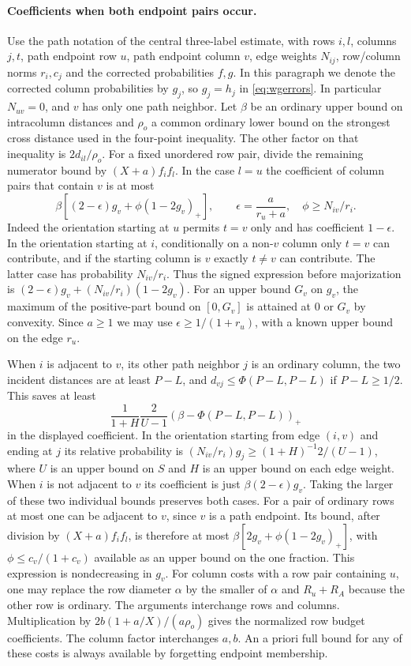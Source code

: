 \documentclass[11pt,a4paper]{article}
\theoremstyle{definition}
\begin{document}
\paragraph{Coefficients when both endpoint pairs occur.}
Use the path notation of the central three-label estimate, with rows $i,l$,
columns $j,t$, path endpoint row $u$, path endpoint column $v$, edge
weights $N_{ij}$, row/column norms $r_i,c_j$ and the corrected
probabilities $f,g$.  In this paragraph we denote the corrected column probabilities by $g_j$,
so $g_j=h_j$ in \eqref{eq:wgerrors}. In particular $N_{uv}=0$, and $v$
has only one path neighbor.  Let $\beta$ be an ordinary upper bound on
intracolumn distances and $\rho_o$ a common ordinary lower bound on the
strongest cross distance used in the four-point inequality.  The other
factor on that inequality is $2d_{il}/\rho_o$.  For a fixed unordered
row pair, divide the remaining numerator bound by $(X+a)f_i f_l$.
In the case $l=u$ the coefficient of column pairs that contain $v$ is at
most
\[
 \beta\left[(2-\epsilon)g_v+
             \phi(1-2g_v)_+\right],
 \qquad
 \epsilon=\frac{a}{r_u+a},\quad \phi\ge N_{iv}/r_i.
\]
Indeed the orientation starting at $u$ permits $t=v$ only and has
coefficient $1-\epsilon$.  In the orientation starting at $i$,
conditionally on a non-$v$ column only $t=v$ can contribute, and if the
starting column is $v$ exactly $t\ne v$ can contribute.  The latter
case has probability $N_{iv}/r_i$.  Thus the signed expression before
majorization is $(2-\epsilon)g_v+(N_{iv}/r_i)(1-2g_v)$.
For an upper bound $G_v$ on $g_v$, the maximum of the positive-part
bound on $[0,G_v]$ is attained at $0$ or $G_v$ by convexity.  Since
$a\ge1$ we may use $\epsilon\ge1/(1+r_u)$, with a known upper bound
on the edge $r_u$.

When $i$ is adjacent to $v$, its other path neighbor $j$ is an
ordinary column, the two incident distances are at least $P-L$, and
$d_{vj}\le\Phi(P-L,P-L)$ if $P-L\ge1/2$.  This saves at least
\[
 \frac{1}{1+H}\frac{2}{U-1}
       (\beta-\Phi(P-L,P-L))_+
\]
in the displayed coefficient. In the orientation starting from edge
$(i,v)$ and ending at $j$ its relative probability is
$(N_{iv}/r_i)g_j\ge(1+H)^{-1}2/(U-1)$, where $U$ is an upper bound
on $S$ and $H$ is an upper bound on each edge weight.  When $i$ is not
adjacent to $v$ its coefficient is just $\beta(2-\epsilon)g_v$.
Taking the larger of these two individual bounds preserves both cases.
For a pair of ordinary rows at most one can be adjacent to $v$,
since $v$ is a path endpoint.  Its bound, after division by
$(X+a)f_i f_l$, is therefore at most
$\beta[2g_v+\phi(1-2g_v)_+]$, with $\phi\le c_v/(1+c_v)$ available
as an upper bound on the one fraction.  This expression is nondecreasing
in $g_v$.  For column costs with a row pair containing $u$, one may
replace the row diameter $\alpha$ by the smaller of $\alpha$ and
$R_u+R_A$ because the other row is ordinary.  The arguments interchange
rows and columns.  Multiplication by $2b(1+a/X)/(a\rho_o)$ gives the
normalized row budget coefficients. The column factor interchanges
$a,b$.  An a priori full bound for any of these costs is always available
by forgetting endpoint membership.
\end{document}
